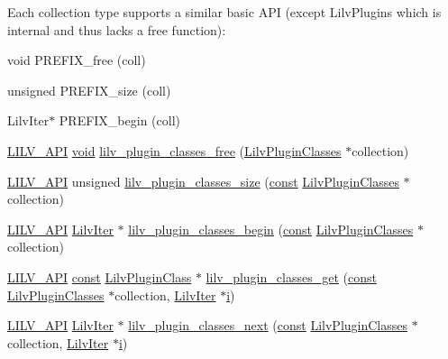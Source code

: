 Each collection type supports a similar basic A\+PI (except Lilv\+Plugins which is internal and thus lacks a free function)\+: 
\begin{DoxyItemize}
\item void P\+R\+E\+F\+I\+X\+\_\+free (coll) 
\item unsigned P\+R\+E\+F\+I\+X\+\_\+size (coll) 
\item Lilv\+Iter$\ast$ P\+R\+E\+F\+I\+X\+\_\+begin (coll) 
\end{DoxyItemize}\begin{DoxyCompactItemize}
\item 
\hyperlink{lilv_8h_aa5182eee7ddff96862d0171967ee6f77}{L\+I\+L\+V\+\_\+\+A\+PI} \hyperlink{sound_8c_ae35f5844602719cf66324f4de2a658b3}{void} \hyperlink{group__lilv_ga2bb721cba50f759a9c7d549c3a9fb52a}{lilv\+\_\+plugin\+\_\+classes\+\_\+free} (\hyperlink{lilv_8h_a1ef5389c0a24cb8e0adcf971d2d12f0e}{Lilv\+Plugin\+Classes} $\ast$collection)
\item 
\hyperlink{lilv_8h_aa5182eee7ddff96862d0171967ee6f77}{L\+I\+L\+V\+\_\+\+A\+PI} unsigned \hyperlink{group__lilv_ga008f382c431be24ae9a06e7761f11a4e}{lilv\+\_\+plugin\+\_\+classes\+\_\+size} (\hyperlink{getopt1_8c_a2c212835823e3c54a8ab6d95c652660e}{const} \hyperlink{lilv_8h_a1ef5389c0a24cb8e0adcf971d2d12f0e}{Lilv\+Plugin\+Classes} $\ast$collection)
\item 
\hyperlink{lilv_8h_aa5182eee7ddff96862d0171967ee6f77}{L\+I\+L\+V\+\_\+\+A\+PI} \hyperlink{lilv_8h_ae86a2663273587d791c8b8fbb008e567}{Lilv\+Iter} $\ast$ \hyperlink{group__lilv_ga53f542a1b0c650158ccf904f08899894}{lilv\+\_\+plugin\+\_\+classes\+\_\+begin} (\hyperlink{getopt1_8c_a2c212835823e3c54a8ab6d95c652660e}{const} \hyperlink{lilv_8h_a1ef5389c0a24cb8e0adcf971d2d12f0e}{Lilv\+Plugin\+Classes} $\ast$collection)
\item 
\hyperlink{lilv_8h_aa5182eee7ddff96862d0171967ee6f77}{L\+I\+L\+V\+\_\+\+A\+PI} \hyperlink{getopt1_8c_a2c212835823e3c54a8ab6d95c652660e}{const} \hyperlink{lilv_8h_a94da06d43a4f980af280b9d8bf4ae1f0}{Lilv\+Plugin\+Class} $\ast$ \hyperlink{group__lilv_ga59b6e58dfd087b6ec86886d6dbdeeab8}{lilv\+\_\+plugin\+\_\+classes\+\_\+get} (\hyperlink{getopt1_8c_a2c212835823e3c54a8ab6d95c652660e}{const} \hyperlink{lilv_8h_a1ef5389c0a24cb8e0adcf971d2d12f0e}{Lilv\+Plugin\+Classes} $\ast$collection, \hyperlink{lilv_8h_ae86a2663273587d791c8b8fbb008e567}{Lilv\+Iter} $\ast$\hyperlink{checksum_8c_ab80e330a3bc9e38c1297fe17381e92b4}{i})
\item 
\hyperlink{lilv_8h_aa5182eee7ddff96862d0171967ee6f77}{L\+I\+L\+V\+\_\+\+A\+PI} \hyperlink{lilv_8h_ae86a2663273587d791c8b8fbb008e567}{Lilv\+Iter} $\ast$ \hyperlink{group__lilv_ga5a2ef38b4a92c011ab300c7e2e9bf896}{lilv\+\_\+plugin\+\_\+classes\+\_\+next} (\hyperlink{getopt1_8c_a2c212835823e3c54a8ab6d95c652660e}{const} \hyperlink{lilv_8h_a1ef5389c0a24cb8e0adcf971d2d12f0e}{Lilv\+Plugin\+Classes} $\ast$collection, \hyperlink{lilv_8h_ae86a2663273587d791c8b8fbb008e567}{Lilv\+Iter} $\ast$\hyperlink{checksum_8c_ab80e330a3bc9e38c1297fe17381e92b4}{i})

\end{DoxyCompactItemize}
